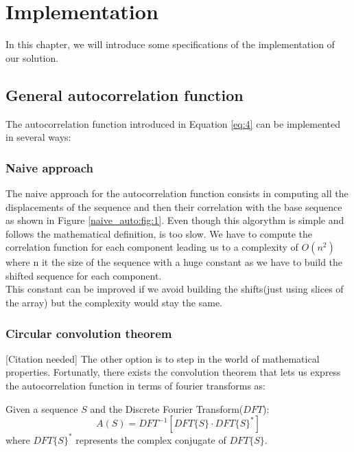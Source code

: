 \chapter{Implementation}
  In this chapter, we will introduce some specifications of the implementation
  of our solution.\\


  \section{General autocorrelation function}
    The autocorrelation function introduced in Equation \ref{eq:4} can be
    implemented in several ways:

      \subsection{Naive approach}
        The naive approach for the autocorrelation function consists in
        computing all the displacements of the sequence and then
        their correlation with the base sequence as shown in Figure
        \ref{naive_auto:fig:1}. Even though this algorythm is simple and follows
        the mathematical definition, is too slow. We have to compute the
        correlation function for each component leading us to a complexity of
        $O(n^{2})$ where n it the size of the sequence with a huge constant
        as we have to build the shifted sequence for each component.\\

        This constant can be improved if we avoid building the shifts(just
        using slices of the array) but the complexity would stay the same.

      \subsection{Circular convolution theorem}
        [Citation needed]
        The other option is to step in the world of mathematical properties.
        Fortunatly, there exists the convolution theorem that lets us express
        the autocorrelation function in terms of fourier transforms as:
        \begin{theorem}
          Given a sequence $S$ and the Discrete Fourier Transform($DFT$):
          \begin{equation}
            A(S) = DFT^{-1}[DFT\{S\} · DFT\{S\}^{*}]
          \end{equation}
          where $DFT\{S\}^{*}$ represents the complex conjugate of $DFT\{S\}$.
        \end{theorem}

